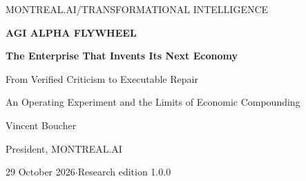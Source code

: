 \documentclass[11pt,letterpaper]{article}
\begin{document}
\thispagestyle{plain}
\begin{center}
{\small MONTREAL.AI\quad /\quad TRANSFORMATIONAL INTELLIGENCE}\par\vspace{0.7em}
{\fontsize{25}{29}\selectfont\bfseries AGI ALPHA FLYWHEEL}\par\vspace{0.35em}
{\Large\bfseries The Enterprise That Invents Its Next Economy}\par\vspace{0.6em}
{\large From Verified Criticism to Executable Repair}\par
{\normalsize An Operating Experiment and the Limits of Economic Compounding}\par\vspace{0.8em}
{\large Vincent Boucher}\par
President, MONTREAL.AI\par\vspace{0.4em}
29 October 2026\quad$\cdot$\quad Research edition 1.0.0\par
\end{center}

\clearpage\begingroup\small\setlength{\parskip}{0pt}\tableofcontents\endgroup\clearpage

\end{document}
